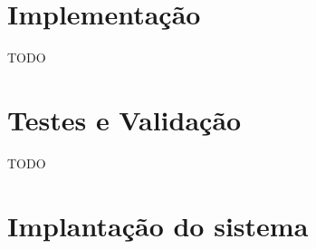 \section{Implementa\c{c}\~ao}
\label{sec:implementacao}



TODO

\section{Testes e Valida\c{c}\~ao}
\label{sec:testesEValidacao}

TODO

\section{Implanta\c{c}\~ao do sistema}
\label{sec:implantacaoDoSistema}

